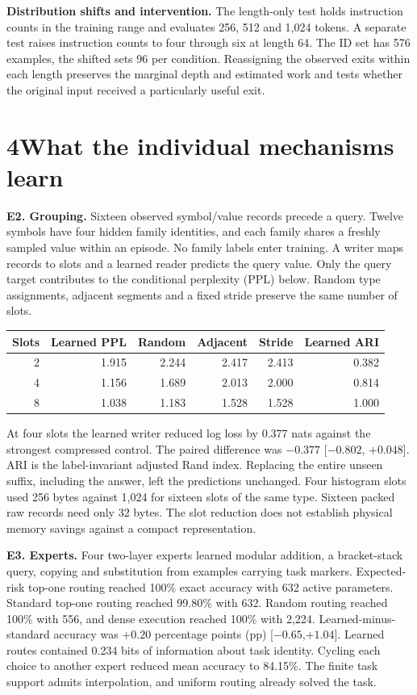 \documentclass[11pt,letterpaper]{article}
\newcommand{\topic}[1]{\par\medskip\noindent\textbf{#1}\enspace}
\begin{document}
\topic{Distribution shifts and intervention.} The length-only test holds instruction counts in the training range and evaluates 256, 512 and 1,024 tokens. A separate test raises instruction counts to four through six at length 64. The ID set has 576 examples, the shifted sets 96 per condition. Reassigning the observed exits within each length preserves the marginal depth and estimated work and tests whether the original input received a particularly useful exit.
\newpage

\newpage
\section*{4\quad What the individual mechanisms learn}
\topic{E2. Grouping.} Sixteen observed symbol/value records precede a query. Twelve symbols have four hidden family identities, and each family shares a freshly sampled value within an episode. No family labels enter training. A writer maps records to slots and a learned reader predicts the query value. Only the query target contributes to the conditional perplexity (PPL) below. Random type assignments, adjacent segments and a fixed stride preserve the same number of slots.
\begin{center}
\begin{tabular}{rrrrrr}\toprule
Slots & Learned PPL & Random & Adjacent & Stride & Learned ARI\\\midrule
2 & 1.915 & 2.244 & 2.417 & 2.413 & 0.382\\
4 & 1.156 & 1.689 & 2.013 & 2.000 & 0.814\\
8 & 1.038 & 1.183 & 1.528 & 1.528 & 1.000\\\bottomrule
\end{tabular}
\end{center}
At four slots the learned writer reduced log loss by 0.377 nats against the strongest compressed control. The paired difference was $-0.377$ [$-0.802$, $+0.048$]. ARI is the label-invariant adjusted Rand index. Replacing the entire unseen suffix, including the answer, left the predictions unchanged. Four histogram slots used 256 bytes against 1,024 for sixteen slots of the same type. Sixteen packed raw records need only 32 bytes. The slot reduction does not establish physical memory savings against a compact representation.

\topic{E3. Experts.} Four two-layer experts learned modular addition, a bracket-stack query, copying and substitution from examples carrying task markers. Expected-risk top-one routing reached 100\% exact accuracy with 632 active parameters. Standard top-one routing reached 99.80\% with 632. Random routing reached 100\% with 556, and dense execution reached 100\% with 2,224. Learned-minus-standard accuracy was $+0.20$ percentage points (pp) [$-0.65$,$+1.04$]. Learned routes contained 0.234 bits of information about task identity. Cycling each choice to another expert reduced mean accuracy to 84.15\%. The finite task support admits interpolation, and uniform routing already solved the task.
\end{document}
